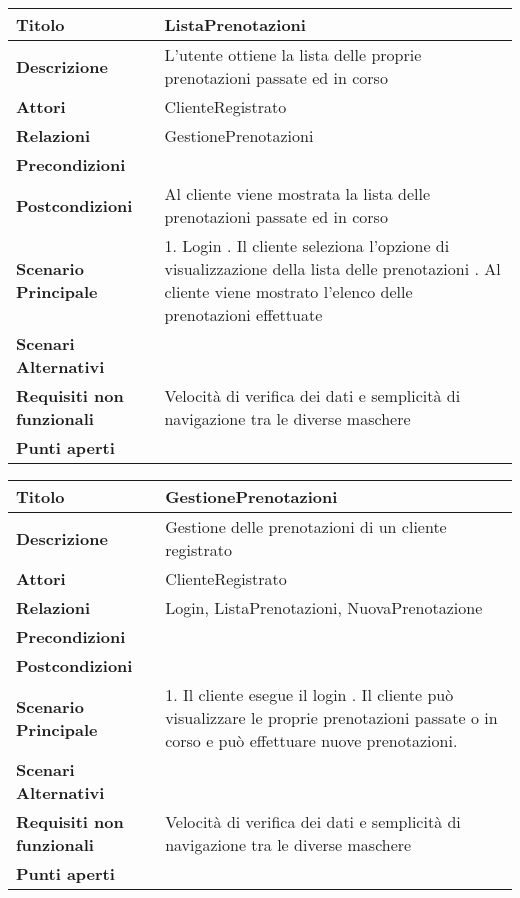 \begin{tabular} {|P{4.5cm}|P{12.5cm}|}
\hline
  \textbf{Titolo} & ListaPrenotazioni\\
\hline
  \textbf{Descrizione} & L'utente ottiene la lista delle proprie prenotazioni passate ed in corso\\
\hline
 \textbf{Attori} & ClienteRegistrato\\
\hline
  \textbf{Relazioni} & GestionePrenotazioni\\
\hline
  \textbf{Precondizioni} &\\
\hline
  \textbf{Postcondizioni} & Al cliente viene mostrata la lista delle prenotazioni passate ed in corso\\
\hline
  \textbf{Scenario Principale} & 1. Login . Il cliente seleziona l'opzione di visualizzazione della lista delle prenotazioni . Al cliente viene mostrato l'elenco delle prenotazioni effettuate\\
\hline
  \textbf{Scenari Alternativi} &\\
\hline
  \textbf{Requisiti non funzionali} & Velocità di verifica dei dati e semplicità di navigazione tra le diverse maschere\\
\hline
  \textbf{Punti aperti} &\\
\hline
\end{tabular}
\hfill
\break


\begin{tabular} {|P{4.5cm}|P{12.5cm}|}
\hline
  \textbf{Titolo} & GestionePrenotazioni\\
\hline
  \textbf{Descrizione} & Gestione delle prenotazioni di un cliente registrato\\
\hline
  \textbf{Attori} & ClienteRegistrato\\
\hline
  \textbf{Relazioni} & Login, ListaPrenotazioni, NuovaPrenotazione\\
\hline
  \textbf{Precondizioni} &\\
\hline
  \textbf{Postcondizioni} &\\
\hline
  \textbf{Scenario Principale} & 1. Il cliente esegue il login . Il cliente può visualizzare le proprie prenotazioni passate o in corso e può effettuare nuove prenotazioni.\\
\hline
  \textbf{Scenari Alternativi} &\\
\hline
  \textbf{Requisiti non funzionali} & Velocità di verifica dei dati e semplicità di navigazione tra le diverse maschere\\
\hline
  \textbf{Punti aperti} &\\
\hline
\end{tabular}

